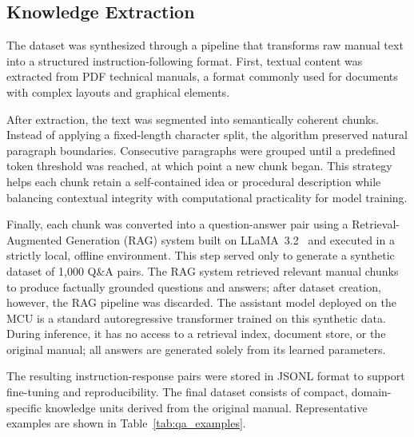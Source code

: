 \documentclass{ieeeaccess}
\begin{document}
\subsection{Knowledge Extraction}
\label{sec:knowledge_extraction}

The dataset was synthesized through a pipeline that transforms raw manual text into a structured instruction-following format. First, textual content was extracted from PDF technical manuals, a format commonly used for documents with complex layouts and graphical elements.

After extraction, the text was segmented into semantically coherent chunks. Instead of applying a fixed-length character split, the algorithm preserved natural paragraph boundaries. Consecutive paragraphs were grouped until a predefined token threshold was reached, at which point a new chunk began. This strategy helps each chunk retain a self-contained idea or procedural description while balancing contextual integrity with computational practicality for model training.

Finally, each chunk was converted into a question-answer pair using a Retrieval-Augmented Generation (RAG) system built on LLaMA~3.2~\cite{llama3} and executed in a strictly local, offline environment. This step served only to generate a synthetic dataset of 1,000 Q\&A pairs. The RAG system retrieved relevant manual chunks to produce factually grounded questions and answers; after dataset creation, however, the RAG pipeline was discarded. The assistant model deployed on the MCU is a standard autoregressive transformer trained on this synthetic data. During inference, it has no access to a retrieval index, document store, or the original manual; all answers are generated solely from its learned parameters.

The resulting instruction-response pairs were stored in JSONL format to support fine-tuning and reproducibility. The final dataset consists of compact, domain-specific knowledge units derived from the original manual. Representative examples are shown in Table~\ref{tab:qa_examples}.
\end{document}
